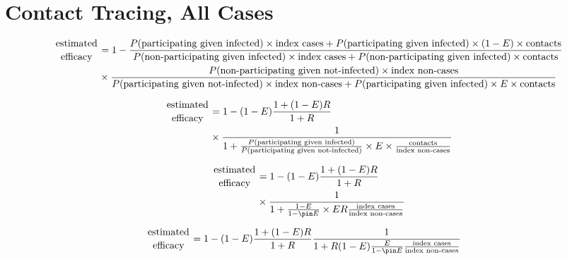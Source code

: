 \documentclass{article}
\begin{document}
\section{Contact Tracing, All Cases}

\begin{equation*}\begin{aligned}
\genfrac{}{}{0pt}{}{\textrm{estimated}}{\textrm{efficacy}} &= 1 - \frac{P(\textrm{participating given infected})\times \textrm{index cases} + P(\textrm{participating given infected})\times (1-E) \times\textrm{contacts}}{P(\textrm{non-participating given infected})\times \textrm{index cases} + P(\textrm{non-participating given infected})\times\textrm{contacts}}\\
&\times\frac{P(\textrm{non-participating given not-infected})\times \textrm{index non-cases}}{P(\textrm{participating given not-infected})\times \textrm{index non-cases} + P(\textrm{participating given infected})\times E \times\textrm{contacts}}
\end{aligned}\end{equation*}

\begin{equation*}\begin{aligned}
\genfrac{}{}{0pt}{}{\textrm{estimated}}{\textrm{efficacy}} &= 1 - (1-E) \frac{1 + (1-E)R}{1 + R}\\
&\times\frac{1}{1+\frac{P(\textrm{participating given infected})}{P(\textrm{participating given not-infected})}\times E \times \frac{\textrm{contacts}}{\textrm{index non-cases}}}
\end{aligned}\end{equation*}

\begin{equation*}\begin{aligned}
\genfrac{}{}{0pt}{}{\textrm{estimated}}{\textrm{efficacy}} &= 1 - (1-E) \frac{1 + (1-E)R}{1 + R}\\
&\times\frac{1}{1+\frac{1-E}{1-\pin E}\times E R\frac{\textrm{index cases}}{\textrm{index non-cases}}}
\end{aligned}\end{equation*}

\begin{equation*}\begin{aligned}
\genfrac{}{}{0pt}{}{\textrm{estimated}}{\textrm{efficacy}} &= 1 - (1-E) \frac{1 + (1-E)R}{1 + R}\frac{1}{1+R(1-E)\frac{E}{1-\pin E}\frac{\textrm{index cases}}{\textrm{index non-cases}}}
\end{aligned}\end{equation*}
\end{document}
